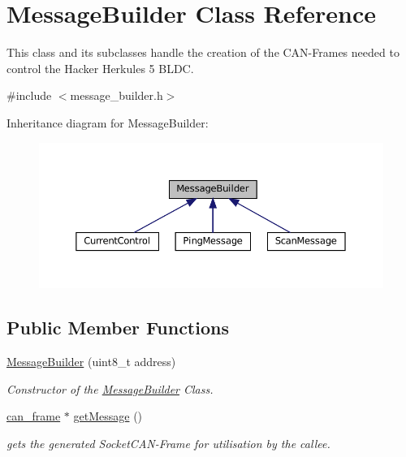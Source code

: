 \hypertarget{classMessageBuilder}{}\section{Message\+Builder Class Reference}
\label{classMessageBuilder}


This class and its subclasses handle the creation of the C\+A\+N-\/\+Frames needed to control the Hacker Herkules 5 B\+L\+DC.  




{\ttfamily \#include $<$message\+\_\+builder.\+h$>$}



Inheritance diagram for Message\+Builder\+:\nopagebreak
\begin{figure}[H]
\begin{center}
\leavevmode
\includegraphics[width=350pt]{classMessageBuilder__inherit__graph}
\end{center}
\end{figure}
\subsection*{Public Member Functions}
\begin{DoxyCompactItemize}
\item 
\hyperlink{classMessageBuilder_a4323114db973ba35f2834b42d6b58aa7}{Message\+Builder} (uint8\+\_\+t address)
\begin{DoxyCompactList}\small\item\em Constructor of the \hyperlink{classMessageBuilder}{Message\+Builder} Class. \end{DoxyCompactList}\item 
\hyperlink{structcan__frame}{can\+\_\+frame} $\ast$ \hyperlink{classMessageBuilder_a588441e4327872e90c3442e1cecd50c3}{get\+Message} ()
\begin{DoxyCompactList}\small\item\em gets the generated Socket\+C\+A\+N-\/\+Frame for utilisation by the callee. \end{DoxyCompactList}\end{DoxyCompactItemize}
